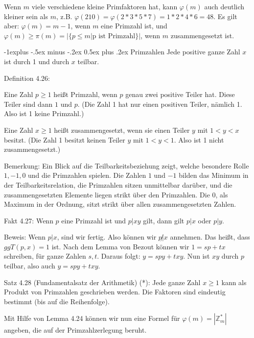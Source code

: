 \documentclass[a4paper]{article}
\makeatletter
\renewcommand{\subsection}{\@startsection{subsection}{2}{0mm}%
 {-1explus -.5ex minus -.2ex}%
 {0.5ex plus .2ex}%
 {\normalfont\normalsize\bfseries}}
\makeatother
\begin{document}
\begin{multicols}{3}
    Wenn $m$ viele verschiedene kleine Primfaktoren hat, kann $\varphi(m)$ auch deutlich kleiner sein als $m$, z.B. $\varphi(210) =\varphi(2*3*5*7)=1*2*4*6=48$. Es gilt aber: $\varphi(m) =m-1$, wenn $m$ eine Primzahl ist, und $\varphi(m)\geq \pi(m) =|\{p\leq m|\text{p ist Primzahl}\}|$, wenn $m$ zusammengesetzt ist.

    \subsection{Primzahlen}
    Jede positive ganze Zahl $x$ ist durch 1 und durch $x$ teilbar.

    Definition 4.26:
    \begin{enumerate*}
        \item Eine Zahl $p\geq 1$ heißt Primzahl, wenn $p$ genau zwei positive Teiler hat. Diese Teiler sind dann $1$ und $p$. (Die Zahl 1 hat nur einen positiven Teiler, nämlich 1. Also ist 1 keine Primzahl.)
        \item Eine Zahl $x\geq 1$ heißt zusammengesetzt, wenn sie einen Teiler $y$ mit $1<y < x$ besitzt. (Die Zahl 1 besitzt keinen Teiler $y$ mit $1<y<1$. Also ist 1 nicht zusammengesetzt.)
    \end{enumerate*}

    Bemerkung: Ein Blick auf die Teilbarkeitsbeziehung zeigt, welche besondere Rolle $1,-1, 0$ und die Primzahlen spielen. Die Zahlen $1$ und $-1$ bilden das Minimum in der Teilbarkeitsrelation, die Primzahlen sitzen unmittelbar darüber, und die zusammengesetzten Elemente liegen strikt über den Primzahlen. Die $0$, als Maximum in der Ordnung, sitzt strikt über allen zusammengesetzten Zahlen.

    Fakt 4.27: Wenn $p$ eine Primzahl ist und $p|xy$ gilt, dann gilt $p|x$ oder $p|y$.

    Beweis: Wenn $p|x$, sind wir fertig. Also können wir $p\not|x$ annehmen. Das heißt, dass $ggT(p,x) = 1$ ist. Nach dem Lemma von Bezout können wir $1 =sp+tx$ schreiben, für ganze Zahlen $s,t$. Daraus folgt: $y=spy+txy$. Nun ist $xy$ durch $p$ teilbar, also auch $y=spy+txy$.

    Satz 4.28 (Fundamentalsatz der Arithmetik) (*): Jede ganze Zahl $x\geq 1$ kann als Produkt von Primzahlen geschrieben werden. Die Faktoren sind eindeutig bestimmt (bis auf die Reihenfolge).

    Mit Hilfe von Lemma 4.24 können wir nun eine Formel für $\varphi(m) =|\mathbb{Z}^*_m|$ angeben, die auf der Primzahlzerlegung beruht.


\end{multicols}
\end{document}
